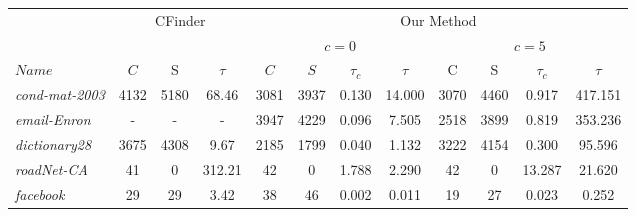\begin{table}[!h]
\begin{tabular}{ l || c c c | c c c c | c c c c }
\toprule\toprule
 					&  		\multicolumn{3}{c}{CFinder}			&		\multicolumn{8}{|c}{Our Method}			\\
 					&  		\multicolumn{3}{c}{}			&		\multicolumn{4}{|c}{$c=0$}			&	\multicolumn{4}{c}{$c=5$}		\\
\hline
$Name$				&	$C$	&	S	&$\tau$		&	$C$	&	$S$	&	$\tau_c$	&	$\tau$	&	C	&	S	&$\tau_c$		&	$\tau$	\\
\hline\hline
{\em cond-mat-2003}		&	4132	&	5180	&	68.46	&	3081	&	3937	&	0.130	&	14.000	&	3070	&	4460	&	0.917	&	417.151	\\
{\em email-Enron}		&	-	&	-	&	-		&	3947	&	4229	&	0.096	&	7.505	&	2518	&	3899	&	0.819	&	353.236	\\
{\em dictionary28}		&	3675	&	4308	&	9.67		&	2185	&	1799	&	0.040	&	1.132	&	3222	&	4154	&	0.300	&	95.596	\\
{\em roadNet-CA}		&	41	&	0	&	312.21	&	42	&	0	&	1.788	&	2.290	&	42	&	0	&	13.287	&	21.620	\\
{\em facebook}	&	29	&	29	&	3.42		&	38	&	46	&	0.002	&	0.011	&	19	&	27	&	0.023	&	0.252	\\
\bottomrule\bottomrule
\end{tabular}

\end{table}
